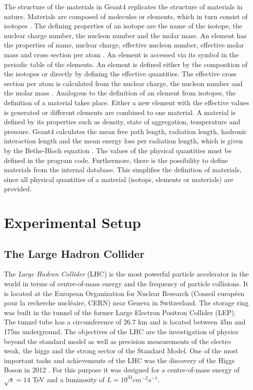 \documentclass[12pt, a4paper]{thesis}
\begin{document}
The structure of the materials in Geant4 replicates the structure of
materials in nature. Materials are composed of molecules or elements,
which in turn consist of isotopes \cite{geant_simul_toolkit}. The
defining properties of an isotope are the name of the isotope, the
nuclear charge number, the nucleon number and the molar mass. An
element has the properties of name, nuclear charge, effective nucleon
number, effective molar mass and cross section per atom
\cite{geant4-doc}. An element is accessed via its symbol in the
periodic table of the elements.  An element is defined either by the
composition of the isotopes or directly by defining the effective
quantities. The effective cross section per atom is calculated from
the nuclear charge, the nucleon number and the molar mass
\cite{geant4-doc}. Analogous to the definition of an element from
isotopes, the definition of a material takes place.  Either a new
element with the effective values is generated or different elements
are combined to one material. A material is defined by its properties
such as density, state of aggregation, temperature and
pressure. Geant4 calculates the mean free path length, radiation
length, hadronic interaction length and the mean energy loss per
radiation length, which is given by the Bethe-Bloch equation
\cite{geant4-doc}. The values of the physical quantities must be
defined in the program code. Furthermore, there is the possibility to
define materials from the internal database. This simplifies the
definition of materials, since all physical quantities of a material
(isotops, elements or materials) are provided.

\chapter{Experimental Setup}
\label{sec:org5cd8e52}
\section{The Large Hadron Collider}
\label{sec:orgf5b86e0}

The \emph{Large Hadron Collider} (LHC) \cite{lhc_machine} is the most
powerful particle accelerator in the world in terms of centre-of-mass
energy and the frequency of particle collisions. It is located at the
European Organization for Nuclear Research (Conseil européen pour la
recherche nucléaire, CERN) near Geneva in Switzerland. The storage
ring was built in the tunnel of the former Large Electron Positron
Collider (LEP). The tunnel tube has a circumference of 26.7 km and is
located between 45m and 175m underground. The objectives of the LHC
are the investigation of physics beyond the standard model as well as
precision measurements of the electro weak, the higgs and the strong
sector of the Standard Model. One of the most important tasks and
achievements of the LHC was the discovery of the Higgs Boson in 2012
\cite{higgs_cms,higgs_atlas}. For this purpose it was designed for a
centre-of-mass energy of \(\sqrt{s} = 14\) TeV and a luminosity of \(L
= 10^{34} cm^{-2}s^{-1}\).
\end{document}
